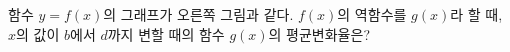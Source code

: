 \noindent\begin{minipage}[t]{0.58\linewidth}\vspace{0pt}\raggedright 함수 $y=f(x)$의 그래프가 오른쪽 그림과 같다. $f(x)$의 역함수를 $g(x)$라 할 때, $x$의 값이 $b$에서 $d$까지 변할 때의 함수 $g(x)$의 평균변화율은? \end{minipage}\hfill\begin{minipage}[t]{0.4\linewidth}\vspace{0pt}\centering \resizebox{\ifdim\width>\linewidth\linewidth\else\width\fi}{!}{}\end{minipage}\par
{}
